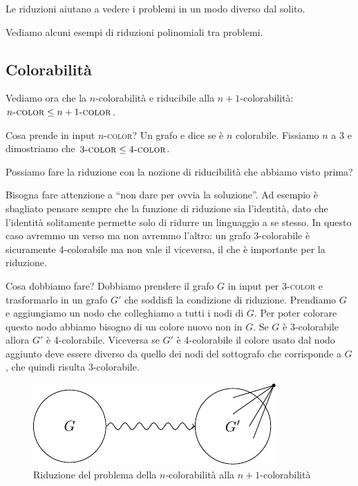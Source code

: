 Le riduzioni aiutano a vedere i problemi in un modo diverso dal solito.

Vediamo alcuni esempi di riduzioni polinomiali tra problemi.

\subsection{Colorabilità}

Vediamo ora che la $n$-colorabilità e riducibile alla $n+1$-colorabilità: $n\textsc{-color} \leq
n+1\textsc{-color}$.

Cosa prende in input $n$\textsc{-color}? Un grafo e dice se è $n$ colorabile. Fissiamo $n$ a 3 e dimostriamo
che $3\textsc{-color} \leq 4\textsc{-color}$.

Possiamo fare la riduzione con la nozione di riducibilità che abbiamo visto prima?

Bisogna fare attenzione a ``non dare per ovvia la soluzione''. Ad esempio è sbagliato pensare
sempre che la funzione di riduzione sia l'identità, dato che l'identità solitamente permette solo
di ridurre un linguaggio a se stesso. In questo caso avremmo un verso ma non avremmo l'altro: un
grafo 3-colorabile è sicuramente 4-colorabile ma non vale il viceversa, il che è importante per la
riduzione.

Cosa dobbiamo fare? Dobbiamo prendere il grafo $G$ in input per 3\textsc{-color} e trasformarlo in
un grafo $G'$ che soddisfi la condizione di riduzione. Prendiamo $G$ e aggiungiamo un nodo che
colleghiamo a tutti i nodi di $G$. Per poter colorare questo nodo abbiamo bisogno di un colore nuovo
non in $G$.  Se $G$ è 3-colorabile allora $G'$ è 4-colorabile. Viceversa se $G'$ è 4-colorabile
il colore usato dal nodo aggiunto deve essere diverso da quello dei nodi del sottografo che
corrisponde a $G$, che quindi risulta 3-colorabile.

\begin{figure}[h]
    \begin{center}
        \includegraphics{./img/complexity_intro/3COL4COL.pdf}
    \end{center}
    \caption{Riduzione del problema della $n$-colorabilità alla $n+1$-colorabilità}
\end{figure}

